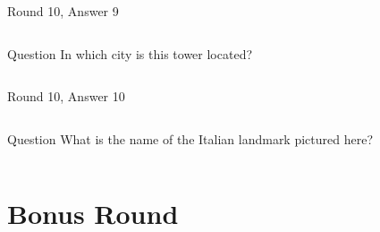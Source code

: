 \documentclass[11pt]{beamer}
\begin{document}
\begin{frame}[t]{Round 10, Answer 9}
\vspace{0.5em}
\begin{columns}[T,totalwidth=\linewidth]
\begin{column}{0.35\linewidth}
\begin{block}{Question}
In which city is this tower located?
\end{block}
\end{column}
\begin{column}{0.6\linewidth}
\begin{center}
\texttt{[image: \{Images/pearltower]}.jpeg}
\end{center}
\end{column}
\end{columns}
\end{frame}
    

\begin{frame}[t]{Round 10, Answer 10}
\vspace{0.5em}
\begin{columns}[T,totalwidth=\linewidth]
\begin{column}{0.35\linewidth}
\begin{block}{Question}
What is the name of the Italian landmark pictured here?
\end{block}
\end{column}
\begin{column}{0.6\linewidth}
\begin{center}
\texttt{[image: \{Images/trajan]}.jpg}
\end{center}
\end{column}
\end{columns}
\end{frame}
    

\def\thisSectionName{Bonus}
\section{Bonus Round}
    
\end{document}
